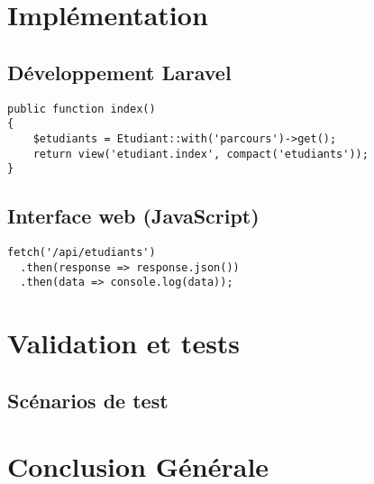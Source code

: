 \documentclass[french,12pt]{report} %
\begin{document}
\chapter{Implémentation}
\section{Développement Laravel}
\begin{lstlisting}[style=phpstyle,caption={Extrait de contrôleur Laravel}]
public function index()
{
    $etudiants = Etudiant::with('parcours')->get();
    return view('etudiant.index', compact('etudiants'));
}
\end{lstlisting}

\section{Interface web (JavaScript)}
\begin{lstlisting}[style=jsstyle,caption={Appel API via Fetch}]
fetch('/api/etudiants')
  .then(response => response.json())
  .then(data => console.log(data));
\end{lstlisting}

\chapter{Validation et tests}
\section{Scénarios de test}

\chapter*{Conclusion Générale}

\printbibliography

\appendix
\end{document}
